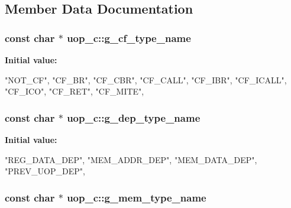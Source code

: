 \subsection{Member Data Documentation}
\hypertarget{classuop__c_acfe5e4dca73fd3122e8379cbdc996006}{
\subsubsection[{g\_\-cf\_\-type\_\-name}]{\setlength{\rightskip}{0pt plus 5cm}const char $\ast$ uop\_\-c::g\_\-cf\_\-type\_\-name}}
\label{classuop__c_acfe5e4dca73fd3122e8379cbdc996006}
{\bfseries Initial value:}
\begin{DoxyCode}
 {
  "NOT_CF",
  "CF_BR",
  "CF_CBR",
  "CF_CALL",
  "CF_IBR",
  "CF_ICALL",
  "CF_ICO",
  "CF_RET",
  "CF_MITE",
}
\end{DoxyCode}
\hypertarget{classuop__c_ae4e41fb0727bb9624e31f174fcfd2e9e}{
\subsubsection[{g\_\-dep\_\-type\_\-name}]{\setlength{\rightskip}{0pt plus 5cm}const char $\ast$ uop\_\-c::g\_\-dep\_\-type\_\-name}}
\label{classuop__c_ae4e41fb0727bb9624e31f174fcfd2e9e}
{\bfseries Initial value:}
\begin{DoxyCode}
 {
  "REG_DATA_DEP",
  "MEM_ADDR_DEP",
  "MEM_DATA_DEP",
  "PREV_UOP_DEP",
}
\end{DoxyCode}
\hypertarget{classuop__c_ac29b63bf10d83cece357e4c46c93e5c6}{
\subsubsection[{g\_\-mem\_\-type\_\-name}]{\setlength{\rightskip}{0pt plus 5cm}const char $\ast$ uop\_\-c::g\_\-mem\_\-type\_\-name}}
\label{classuop__c_ac29b63bf10d83cece357e4c46c93e5c6}
